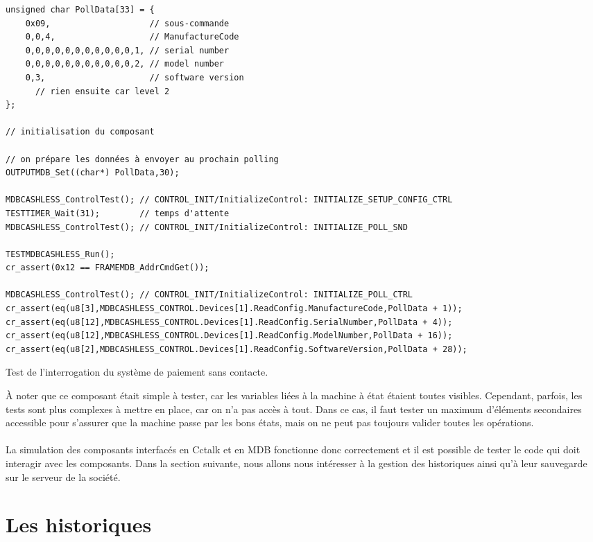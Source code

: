 \documentclass[a4paper]{article}
\begin{document}
\begin{listing}[ht!]
\begin{verbatim}
unsigned char PollData[33] = {
    0x09,                    // sous-commande
    0,0,4,                   // ManufactureCode
    0,0,0,0,0,0,0,0,0,0,0,1, // serial number
    0,0,0,0,0,0,0,0,0,0,0,2, // model number
    0,3,                     // software version
      // rien ensuite car level 2
};

// initialisation du composant

// on prépare les données à envoyer au prochain polling
OUTPUTMDB_Set((char*) PollData,30);

MDBCASHLESS_ControlTest(); // CONTROL_INIT/InitializeControl: INITIALIZE_SETUP_CONFIG_CTRL
TESTTIMER_Wait(31);        // temps d'attente
MDBCASHLESS_ControlTest(); // CONTROL_INIT/InitializeControl: INITIALIZE_POLL_SND

TESTMDBCASHLESS_Run();
cr_assert(0x12 == FRAMEMDB_AddrCmdGet());

MDBCASHLESS_ControlTest(); // CONTROL_INIT/InitializeControl: INITIALIZE_POLL_CTRL
cr_assert(eq(u8[3],MDBCASHLESS_CONTROL.Devices[1].ReadConfig.ManufactureCode,PollData + 1));
cr_assert(eq(u8[12],MDBCASHLESS_CONTROL.Devices[1].ReadConfig.SerialNumber,PollData + 4));
cr_assert(eq(u8[12],MDBCASHLESS_CONTROL.Devices[1].ReadConfig.ModelNumber,PollData + 16));
cr_assert(eq(u8[2],MDBCASHLESS_CONTROL.Devices[1].ReadConfig.SoftwareVersion,PollData + 28));
\end{verbatim}
\caption{Test de l'interrogation du système de paiement sans contacte.}
\label{extestmdb}
\end{listing}

À noter que ce composant était simple à tester, car les variables liées à la
machine à état étaient toutes visibles. Cependant, parfois, les tests sont plus
complexes à mettre en place, car on n'a pas accès à tout. Dans ce cas, il faut
tester un maximum d'éléments secondaires accessible pour s'assurer que la
machine passe par les bons états, mais on ne peut pas toujours valider toutes les
opérations.\\~\\

La simulation des composants interfacés en Cctalk et en MDB fonctionne donc
correctement et il est possible de tester le code qui doit interagir avec les
composants. Dans la section suivante, nous allons nous intéresser à la gestion
des historiques ainsi qu'à leur sauvegarde sur le serveur de la société.
\section{Les historiques}%
\end{document}
